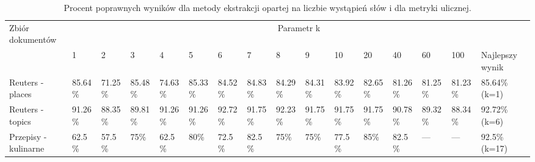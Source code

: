 \documentclass{classrep}
\begin{document}
\begingroup
{\scriptsize  
\setlength{\LTleft}{-20cm plus -1fill}
\setlength{\LTright}{\LTleft}

\begin{longtable}{|p{1cm}|p{0.7cm}|p{0.7cm}|p{0.7cm}|p{0.7cm}|p{0.7cm}|p{0.7cm}|p{0.7cm}|p{0.7cm}|p{0.7cm}|p{0.7cm}|p{0.7cm}|p{0.7cm}|p{0.7cm}|p{0.7cm}|p{1.1cm}|}
\caption{ Procent poprawnych wyników dla metody ekstrakcji opartej na liczbie wystąpień słów i dla metryki ulicznej.}\\ 
\hline

Zbiór
dokumentów

 &\multicolumn{15}{c|}{Parametr k}\\
\cline{2-16}
& 1
& 2
& 3
& 4
& 5
& 6
& 7
& 8
& 9
& 10
& 20
& 40
& 60
& 100
& Najlepszy wynik
\\ \hline\hline
Reuters
- places
& 85.64\%	%
& 71.25\%	%
& 85.48\%	%
& 74.63\%	%
& 85.33\%	%
& 84.52\%	%
& 84.83\%	%
& 84.29\%	%
& 84.31\%	%
& 83.92\%	%
& 82.65\%	%
& 81.26\%	%
& 81.25\%	%
& 81.23\%	%
& 85.64\% (k=1)
\\ \hline
Reuters
- topics
& 91.26\%	%
& 88.35\%	%
& 89.81\%	%
& 91.26\%	%
& 91.26\%	%
& 92.72\%	%
& 91.75\%	%
& 92.23\%	%
& 91.75\%	%
& 91.75\%	%
& 91.75\%	%
& 90.78\%	%
& 89.32\%	%
& 88.34\%	%
& 92.72\%  (k=6)
\\ \hline
Przepisy
- kulinarne 
& 62.5\%	%
& 57.5\%	%
& 75\%		%
& 62.5\%	%
& 80\%		%
& 72.5\%	%
& 82.5\%	%
& 75\%		%
& 75\%		%
& 77.5\%	%
& 85\%		%
& 82.5\%	%
& ---		%
& ---		%
& 92.5\% (k=17)
\\ \hline
\end{longtable}
}
\endgroup



\end{document}
